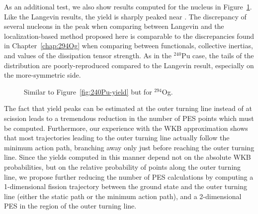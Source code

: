 As an additional test, we also show results computed for the nucleus {\Og} in Figure~\ref{fig:294Og-frags}. Like the Langevin results, the yield is sharply peaked near {\Pb}. The discrepancy of several nucleons in the peak when comparing between Langevin and the localization-based method proposed here is comparable to the discrepancies found in Chapter~\ref{chap:294Og} when comparing between functionals, collective inertias, and values of the dissipation tensor strength. As in the $^{240}$Pu case, the tails of the distribution are poorly-reproduced compared to the Langevin result, especially on the more-symmetric side.

\begin{figure}%
	\centering
	\qquad
	\caption{Similar to Figure~\ref{fig:240Pu-yield} but for $^{294}$Og.}%
	\label{fig:294Og-frags}%
\end{figure}

The fact that yield peaks can be estimated at the outer turning line instead of at scission leads to a tremendous reduction in the number of PES points which must be computed. Furthermore, our experience with the WKB approximation shows that most trajectories leading to the outer turning line actually follow the minimum action path, branching away only just before reaching the outer turning line. Since the yields computed in this manner depend not on the absolute WKB probabilities, but on the relative probability of points along the outer turning line, we propose further reducing the number of PES calculations by computing a 1-dimensional fission trajectory between the ground state and the outer turning line (either the static path or the minimum action path), and a 2-dimensional PES in the region of the outer turning line.


